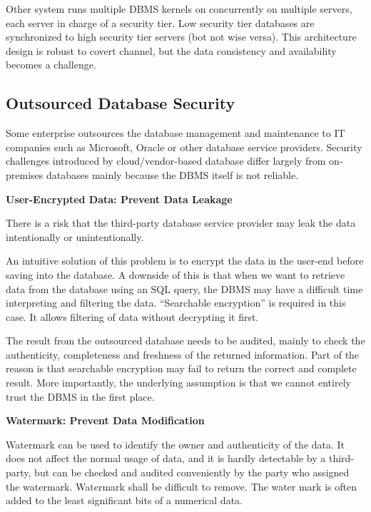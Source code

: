 Other system runs multiple DBMS kernels on concurrently on multiple servers, each server in charge of a security tier. Low security tier databases are synchronized to high security tier servers (bot not wise versa). This architecture design is robust to covert channel, but the data consistency and availability becomes a challenge.

\subsection{Outsourced Database Security}

Some enterprise outsources the database management and maintenance to IT companies such as Microsoft, Oracle or other database service providers. Security challenges introduced by cloud/vendor-based database differ largely from on-premises databases mainly because the DBMS itself is not reliable.

\vspace{0.1in}
\noindent \textbf{User-Encrypted Data: Prevent Data Leakage}
\vspace{0.1in}

There is a risk that the third-party database service provider may leak the data intentionally or unintentionally.

An intuitive solution of this problem is to encrypt the data in the user-end before saving into the database. A downside of this is that when we want to retrieve data from the database using an SQL query, the DBMS may have a difficult time interpreting and filtering the data. ``Searchable encryption'' is required in this case. It allows filtering of data without decrypting it first.

The result from the outsourced database needs to be audited, mainly to check the authenticity, completeness and freshness of the returned information. Part of the reason is that searchable encryption may fail to return the correct and complete result. More importantly, the underlying assumption is that we cannot entirely trust the DBMS in the first place.

\vspace{0.1in}
\noindent \textbf{Watermark: Prevent Data Modification}
\vspace{0.1in}

Watermark can be used to identify the owner and authenticity of the data. It does not affect the normal usage of data, and it is hardly detectable by a third-party, but can be checked and audited conveniently by the party who assigned the watermark. Watermark shall be difficult to remove. The water mark is often added to the least significant bits of a numerical data.

